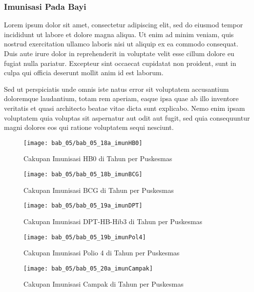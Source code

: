 \subsubsection{Imunisasi Pada Bayi}
Lorem ipsum dolor sit amet, consectetur adipiscing elit, sed do eiusmod tempor incididunt ut labore et dolore magna aliqua. Ut enim ad minim veniam, quis nostrud exercitation ullamco laboris nisi ut aliquip ex ea commodo consequat. Duis aute irure dolor in reprehenderit in voluptate velit esse cillum dolore eu fugiat nulla pariatur. Excepteur sint occaecat cupidatat non proident, sunt in culpa qui officia deserunt mollit anim id est laborum.

Sed ut perspiciatis unde omnis iste natus error sit voluptatem accusantium doloremque laudantium, totam rem aperiam, eaque ipsa quae ab illo inventore veritatis et quasi architecto beatae vitae dicta sunt explicabo. Nemo enim ipsam voluptatem quia voluptas sit aspernatur aut odit aut fugit, sed quia consequuntur magni dolores eos qui ratione voluptatem sequi nesciunt.

\begin{figure}[H]
    \centering
    \texttt{[image: bab\_05/bab\_05\_18a\_imunHB0]}
    \caption{Cakupan Imunisasi HB0 di \namaKabupaten Tahun \tP per Puskesmas}
    \label{fig:Cakupan-Imunisasi-HB0}
\end{figure}

\begin{figure}[H]
    \centering
    \texttt{[image: bab\_05/bab\_05\_18b\_imunBCG]}
    \caption{Cakupan Imunisasi BCG di \namaKabupaten Tahun \tP per Puskesmas}
    \label{fig:Cakupan-Imunisasi-BCG}
\end{figure}

\begin{figure}[H]
    \centering
    \texttt{[image: bab\_05/bab\_05\_19a\_imunDPT]}
    \caption{Cakupan Imunisasi DPT-HB-Hib3 di \namaKabupaten Tahun \tP per Puskesmas}
    \label{fig:Cakupan-Imunisasi-DPT}
\end{figure}

\begin{figure}[H]
    \centering
    \texttt{[image: bab\_05/bab\_05\_19b\_imunPol4]}
    \caption{Cakupan Imunisasi Polio 4 di \namaKabupaten Tahun \tP per Puskesmas}
    \label{fig:Cakupan-Imunisasi-Polio4}
\end{figure}

\begin{figure}[H]
    \centering
    \texttt{[image: bab\_05/bab\_05\_20a\_imunCampak]}
    \caption{Cakupan Imunisasi Campak di \namaKabupaten Tahun \tP per Puskesmas}
    \label{fig:Cakupan-Imunisasi-Campak}
\end{figure}

